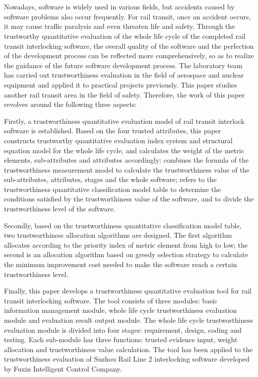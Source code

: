 \newpage
\vspace{-1cm}
\chapter*{}
\vspace{-0.5cm}
 Nowadays, software is widely used in various fields, but accidents caused by software problems also occur frequently. For rail transit, once an accident occurs, it may cause traffic paralysis and even threaten life and safety. Through the trustworthy quantitative evaluation of the whole life cycle of the completed rail transit interlocking software, the overall quality of the software and the perfection of the development process can be reflected more comprehensively, so as to realize the guidance of the future software development process. The laboratory team has carried out trustworthiness evaluation in the field of aerospace and nuclear equipment and applied it to practical projects previously. This paper studies another rail transit area in the field of safety. Therefore, the work of this paper revolves around the following three aspects:
 
 Firstly, a trustworthiness quantitative evaluation model of rail transit interlock software is established. Based on the four trusted attributes, this paper constructs trustworthy quantitative evaluation index system and structural equation model for the whole life cycle, and calculates the weight of the metric elements, sub-attributes and attributes accordingly; combines the formula of the trustworthiness measurement model to calculate the trustworthiness value of the sub-attributes, attributes, stages and the whole software; refers to the trustworthiness quantitative classification model table to determine the conditions satisfied by the trustworthiness value of the software, and to divide the trustworthiness level of the software.
 
 Secondly, based on the trustworthiness quantitative classification model table, two trustworthiness allocation algorithms are designed. The first algorithm allocates according to the priority index of metric element from high to low; the second is an allocation algorithm based on greedy selection strategy to calculate the minimum improvement cost needed to make the software reach a certain trustworthiness level.
 
 Finally, this paper develops a trustworthiness quantitative evaluation tool for rail transit interlocking software. The tool consists of three modules: basic information management module, whole life cycle trustworthiness evaluation module and evaluation result output module. The whole life cycle trustworthiness evaluation module is divided into four stages: requirement, design, coding and testing. Each sub-module has three functions: trusted evidence input, weight allocation and trustworthiness value calculation. The tool has been applied to the trustworthiness evaluation of Suzhou Rail Line 2 interlocking software developed by Fuxin Intelligent Control Company.

